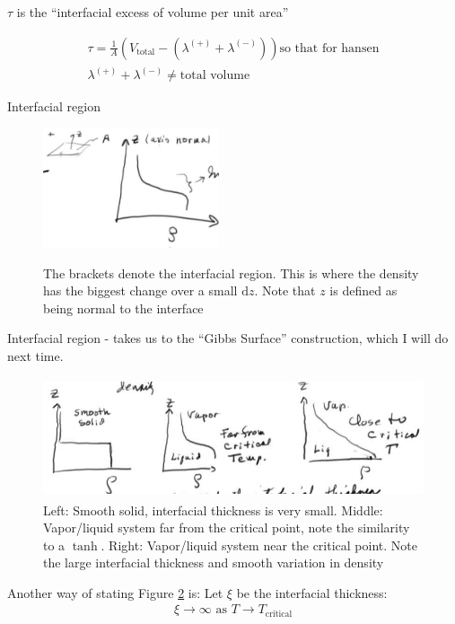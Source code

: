 \documentclass{article}
\renewcommand{\d}[0]{\mathrm{d}}
\begin{document}
$\tau$ is the ``interfacial excess of volume per unit area''

\begin{align*}
  \tau = \frac{1}{A}(V_\text{total} - (\lambda^{(+)} + \lambda^{(-)})) \text{so that for hansen}\\
  \lambda^{(+)} + \lambda^{(-)} \neq \text{total volume}
\end{align*}

\begin{section}{Interfacial region}
  \begin{figure}[h]
    \centering
    \includegraphics[height=100pt]{interfacialRegion}
    \label{fig:InterfacialRegion}
    \caption{The brackets denote the interfacial region. This is where the density has the biggest change over a small $\d z$. Note that $z$ is defined as being normal to the interface}
  \end{figure}
  Interfacial region - takes us to the ``Gibbs Surface'' construction, which I will do next time.
  \begin{figure}[h]
    \centering
    \includegraphics[height=100pt]{interfaceBar}
    \caption{Left: Smooth solid, interfacial thickness is very small. Middle: Vapor/liquid system far from the critical point, note the similarity to a $\tanh$. Right: Vapor/liquid system near the critical point. Note the large interfacial thickness and smooth variation in density}
    \label{fig:InterfaceBar}
  \end{figure}
  
Another way of stating Figure \ref{fig:InterfaceBar} is: Let $\xi$ be the interfacial thickness:
\begin{align*}
\xi\rightarrow\infty \text{ as } T\rightarrow T_\text{critical}
\end{align*}
\end{section}
\end{document}
